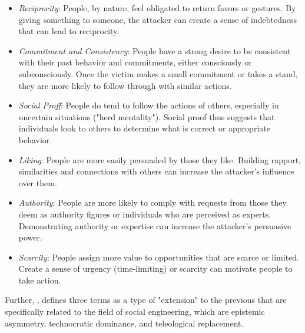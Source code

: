 \begin{itemize}
    \item \textit{Reciprocity}: People, by nature, feel obligated to return favors or gestures. By giving something to someone, the attacker can create a sense of indebtedness that can lead to reciprocity.

    \item \textit{Commitment and Consistency}: People have a strong desire to be consistent with their past behavior and commitments, either consciously or subconsciously. Once the victim makes a small commitment or takes a stand, they are more likely to follow through with similar actions. %

    \item \textit{Social Proff}: People do tend to follow the actions of others, especially in uncertain situations ("herd mentality"). Social proof thus suggests that individuals look to others to determine what is correct or appropriate behavior.%

    \item \textit{Liking}: People are more easily persuaded by those they like. Building rapport, similarities and connections with others can increase the attacker's influence over them. %

    \item \textit{Authority}: People are more likely to comply with requests from those they deem as authority figures or individuals who are perceived as experts. Demonstrating authority or expertise can increase the attacker's persuasive power.

    \item \textit{Scarcity}: People assign more value to opportunities that are scarce or limited. Create a sense of urgency (time-limiting) or scarcity can motivate people to take action.
\end{itemize}

Further, \cite{hatfieldSocialEngineeringCybersecurity2018a}, defines three terms as a type of "extension" to the previous that are specifically related to the field of social engineering, which are epistemic asymmetry, technocratic dominance, and teleological replacement.

